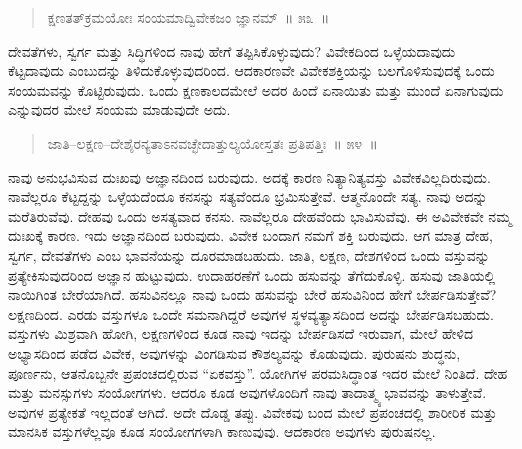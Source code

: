 \vspace{-0.3cm}

\begin{verse}
ಕ್ಷಣತತ್​ಕ್ರಮಯೋಃ ಸಂಯಮಾದ್ವಿವೇಕಜಂ ಜ್ಞಾನಮ್​~॥ ೫೩~॥
\end{verse}

\vspace{-0.4cm}


\vspace{0.1cm}

ದೇವತೆಗಳು, ಸ್ವರ್ಗ ಮತ್ತು ಸಿದ್ಧಿಗಳಿಂದ ನಾವು ಹೇಗೆ ತಪ್ಪಿಸಿಕೊಳ್ಳುವುದು? ವಿವೇಕದಿಂದ ಒಳ್ಳೆಯದಾವುದು ಕೆಟ್ಟದಾವುದು ಎಂಬುದನ್ನು ತಿಳಿದುಕೊಳ್ಳುವುದರಿಂದ. ಆದಕಾರಣವೇ ವಿವೇಕಶಕ್ತಿಯನ್ನು ಬಲಗೊಳಿಸುವುದಕ್ಕೆ ಒಂದು ಸಂಯಮವನ್ನು ಕೊಟ್ಟಿರುವುದು. ಒಂದು ಕ್ಷಣಕಾಲದಮೇಲೆ ಅದರ ಹಿಂದೆ ಏನಾಯಿತು ಮತ್ತು ಮುಂದೆ ಏನಾಗುವುದು ಎನ್ನುವುದರ ಮೇಲೆ ಸಂಯಮ ಮಾಡುವುದೇ ಅದು. 

\vspace{-0.3cm}

\begin{verse}
ಜಾತಿ–ಲಕ್ಷಣ–ದೇಶೈರನ್ಯತಾಽನವಚ್ಛೇದಾತ್ತುಲ್ಯಯೋಸ್ತತಃ ಪ್ರತಿಪತ್ತಿಃ~॥ ೫೪~॥
\end{verse}

\vspace{-0.4cm}


\vspace{0.1cm}

ನಾವು ಅನುಭವಿಸುವ ದುಃಖವು ಅಜ್ಞಾನದಿಂದ ಬರುವುದು. ಅದಕ್ಕೆ ಕಾರಣ ನಿತ್ಯಾನಿತ್ಯವಸ್ತು ವಿವೇಕವಿಲ್ಲದಿರುವುದು. ನಾವೆಲ್ಲರೂ ಕೆಟ್ಟದ್ದನ್ನು ಒಳ್ಳೆಯದೆಂದೂ ಕನಸನ್ನು ಸತ್ಯವೆಂದೂ ಭ್ರಮಿಸುತ್ತೇವೆ. ಆತ್ಮನೊಂದೇ ಸತ್ಯ. ನಾವು ಅದನ್ನು ಮರೆತಿರುವೆವು. ದೇಹವು ಒಂದು ಅಸತ್ಯವಾದ ಕನಸು. ನಾವೆಲ್ಲರೂ ದೇಹವೆಂದು ಭಾವಿಸುವೆವು. ಈ ಅವಿವೇಕವೇ ನಮ್ಮ ದುಃಖಕ್ಕೆ ಕಾರಣ. ಇದು ಅಜ್ಞಾನದಿಂದ ಬರುವುದು. ವಿವೇಕ ಬಂದಾಗ ನಮಗೆ ಶಕ್ತಿ ಬರುವುದು. ಆಗ ಮಾತ್ರ ದೇಹ, ಸ್ವರ್ಗ, ದೇವತೆಗಳು ಎಂಬ ಭಾವನೆಯನ್ನು ದೂರಮಾಡಬಹುದು. ಜಾತಿ, ಲಕ್ಷಣ, ದೇಶಗಳಿಂದ ಒಂದು ವಸ್ತುವನ್ನು ಪ್ರತ್ಯೇಕಿಸುವುದರಿಂದ ಅಜ್ಞಾನ ಹುಟ್ಟುವುದು. ಉದಾಹರಣೆಗೆ ಒಂದು ಹಸುವನ್ನು ತೆಗೆದುಕೊಳ್ಳಿ. ಹಸುವು ಜಾತಿಯಲ್ಲಿ ನಾಯಿಗಿಂತ ಬೇರೆಯಾಗಿದೆ. ಹಸುವಿನಲ್ಲೂ ನಾವು ಒಂದು ಹಸುವನ್ನು ಬೇರೆ ಹಸುವಿನಿಂದ ಹೇಗೆ ಬೇರ್ಪಡಿಸುತ್ತೇವೆ? ಲಕ್ಷಣದಿಂದ. ಎರಡು ವಸ್ತುಗಳೂ ಒಂದೇ ಸಮನಾಗಿದ್ದರೆ ಅವುಗಳ ಸ್ಥಳವ್ಯತ್ಯಾಸದಿಂದ ಅದನ್ನು ಬೇರ್ಪಡಿಸಬಹುದು. ವಸ್ತುಗಳು ಮಿಶ್ರವಾಗಿ ಹೋಗಿ, ಲಕ್ಷಣಗಳಿಂದ ಕೂಡ ನಾವು ಇದನ್ನು ಬೇರ್ಪಡಿಸದೆ ಇರುವಾಗ, ಮೇಲೆ ಹೇಳಿದ ಅಭ್ಯಾಸದಿಂದ ಪಡೆದ ವಿವೇಕ, ಅವುಗಳನ್ನು ವಿಂಗಡಿಸುವ ಕೌಶಲ್ಯವನ್ನು ಕೊಡುವುದು. ಪುರುಷನು ಶುದ್ಧನು, ಪೂರ್ಣನು, ಆತನೊಬ್ಬನೇ ಪ್ರಪಂಚದಲ್ಲಿರುವ “ಏಕವಸ್ತು”. ಯೋಗಿಗಳ ಪರಮಸಿದ್ಧಾಂತ ಇದರ ಮೇಲೆ ನಿಂತಿದೆ. ದೇಹ ಮತ್ತು ಮನಸ್ಸುಗಳು ಸಂಯೋಗಗಳು. ಆದರೂ ಕೂಡ ಅವುಗಳೊಂದಿಗೆ ನಾವು ತಾದಾತ್ಮ್ಯ ಭಾವವನ್ನು ತಾಳುತ್ತೇವೆ. ಅವುಗಳ ಪ್ರತ್ಯೇಕತೆ ಇಲ್ಲದಂತೆ ಆಗಿದೆ. ಅದೇ ದೊಡ್ಡ ತಪ್ಪು. ವಿವೇಕವು ಬಂದ ಮೇಲೆ ಪ್ರಪಂಚದಲ್ಲಿ ಶಾರೀರಿಕ ಮತ್ತು ಮಾನಸಿಕ ವಸ್ತುಗಳೆಲ್ಲವೂ ಕೂಡ ಸಂಯೋಗಗಳಾಗಿ ಕಾಣುವುವು. ಆದಕಾರಣ ಅವುಗಳು ಪುರುಷನಲ್ಲ. 

